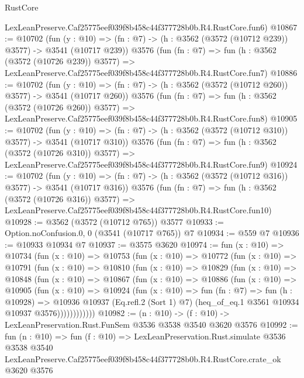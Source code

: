 \begin{lexlean}{RustCore}
\begin{coremodule}
    LexLeanPreserve.Caf25775eef039f8b458c44f377728b0b.R4.RustCore.fun6)
@10867 := @10702
    (fun (y : @10) => (fn : @7) -> (h : @3562 (@3572 (@10712 @239)) @3577) -> @3541 (@10717 @239))
    @3576
    (fun (fn : @7) =>
    fun (h : @3562 (@3572 (@10726 @239)) @3577) =>
    LexLeanPreserve.Caf25775eef039f8b458c44f377728b0b.R4.RustCore.fun7)
@10886 := @10702
    (fun (y : @10) => (fn : @7) -> (h : @3562 (@3572 (@10712 @260)) @3577) -> @3541 (@10717 @260))
    @3576
    (fun (fn : @7) =>
    fun (h : @3562 (@3572 (@10726 @260)) @3577) =>
    LexLeanPreserve.Caf25775eef039f8b458c44f377728b0b.R4.RustCore.fun8)
@10905 := @10702
    (fun (y : @10) => (fn : @7) -> (h : @3562 (@3572 (@10712 @310)) @3577) -> @3541 (@10717 @310))
    @3576
    (fun (fn : @7) =>
    fun (h : @3562 (@3572 (@10726 @310)) @3577) =>
    LexLeanPreserve.Caf25775eef039f8b458c44f377728b0b.R4.RustCore.fun9)
@10924 := @10702
    (fun (y : @10) => (fn : @7) -> (h : @3562 (@3572 (@10712 @316)) @3577) -> @3541 (@10717 @316))
    @3576
    (fun (fn : @7) =>
    fun (h : @3562 (@3572 (@10726 @316)) @3577) =>
    LexLeanPreserve.Caf25775eef039f8b458c44f377728b0b.R4.RustCore.fun10)
@10928 := @3562 (@3572 (@10712 @765)) @3577
@10933 := Option.noConfusion.{0, 0} (@3541 (@10717 @765)) @7
@10934 := @559 @7
@10936 := @10933 @10934 @7
@10937 := @3575 @3620
@10974 := fun (x : @10) =>
  @10734
    (fun (x : @10) =>
    @10753
      (fun (x : @10) =>
      @10772
        (fun (x : @10) =>
        @10791
          (fun (x : @10) =>
          @10810
            (fun (x : @10) =>
            @10829
              (fun (x : @10) =>
              @10848
                (fun (x : @10) =>
                @10867
                  (fun (x : @10) =>
                  @10886
                    (fun (x : @10) =>
                    @10905
                      (fun (x : @10) =>
                      @10924
                        (fun (x : @10) =>
                        fun (fn : @7) =>
                        fun (h : @10928) =>
                        @10936
                          @10937
                          (Eq.refl.{2} (Sort 1) @7)
                          (heq_of_eq.{1} @3561 @10934 @10937 @3576))))))))))))
@10982 := (n : @10) -> (f : @10) -> LexLeanPreservation.Rust.FunSem @3536 @3538 @3540 @3620 @3576
@10992 := fun (n : @10) =>
  fun (f : @10) =>
  LexLeanPreservation.Rust.simulate
    @3536
    @3538
    @3540
    LexLeanPreserve.Caf25775eef039f8b458c44f377728b0b.R4.RustCore.crate_ok
    @3620
    @3576
\end{coremodule}
\end{lexlean}
